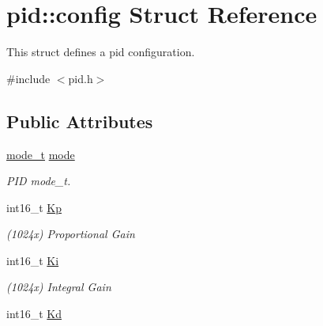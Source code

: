 \hypertarget{structpid_1_1config}{\section{pid\-:\-:config Struct Reference}
\label{structpid_1_1config}
}


This struct defines a pid configuration.  




{\ttfamily \#include $<$pid.\-h$>$}

\subsection*{Public Attributes}
\begin{DoxyCompactItemize}
\item 
\hypertarget{structpid_1_1config_a2b1542abdc151361afa4d989710df24f}{\hyperlink{classpid_a22af7b8da10bf9878ae85f6a90991054}{mode\-\_\-t} \hyperlink{structpid_1_1config_a2b1542abdc151361afa4d989710df24f}{mode}}\label{structpid_1_1config_a2b1542abdc151361afa4d989710df24f}

\begin{DoxyCompactList}\small\item\em P\-I\-D {\ttfamily mode\-\_\-t}. \end{DoxyCompactList}\item 
\hypertarget{structpid_1_1config_ae727d2723fb606e01a49e67dc9c8cfa4}{int16\-\_\-t \hyperlink{structpid_1_1config_ae727d2723fb606e01a49e67dc9c8cfa4}{Kp}}\label{structpid_1_1config_ae727d2723fb606e01a49e67dc9c8cfa4}

\begin{DoxyCompactList}\small\item\em (1024x) Proportional Gain \end{DoxyCompactList}\item 
\hypertarget{structpid_1_1config_a5924aa2bdfe481434458b2cfe54731ca}{int16\-\_\-t \hyperlink{structpid_1_1config_a5924aa2bdfe481434458b2cfe54731ca}{Ki}}\label{structpid_1_1config_a5924aa2bdfe481434458b2cfe54731ca}

\begin{DoxyCompactList}\small\item\em (1024x) Integral Gain \end{DoxyCompactList}\item 
\hypertarget{structpid_1_1config_a4d8a6c0fbb05c1eb352629aec80e65eb}{int16\-\_\-t \hyperlink{structpid_1_1config_a4d8a6c0fbb05c1eb352629aec80e65eb}{Kd}}\label{structpid_1_1config_a4d8a6c0fbb05c1eb352629aec80e65eb}


\end{DoxyCompactItemize}
